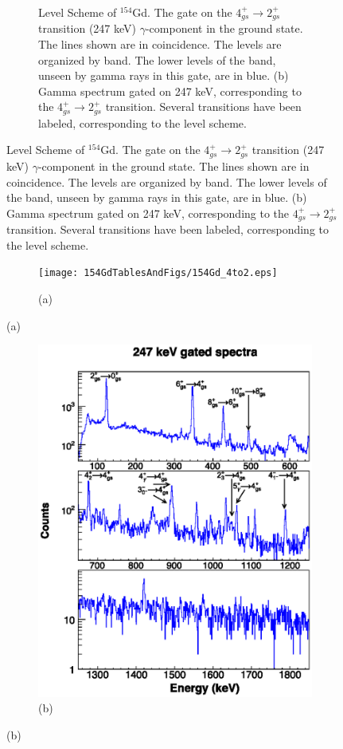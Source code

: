 \begin{landscape}
\begin{figure}[!]
    \centering
    \label{fig:154_4to2}
    \begin{subfigure}{1.4\textwidth}
    \caption{\centering \fontsize{10pt}{12pt}Level Scheme of $^{154}$Gd. The gate on the $4_{gs}^+\rightarrow 2_{gs}^+$ transition (247 keV) $\gamma$-component in the ground state. The lines shown are in coincidence. The levels are organized by band. The lower levels of the band, unseen by gamma rays in this gate, are in blue. (b) Gamma spectrum gated on 247 keV, corresponding to the $4_{gs}^+\rightarrow 2_{gs}^+$ transition. Several transitions have been labeled, corresponding to the level scheme.}
    \end{subfigure}
\end{figure}
\clearpage
\begin{figure}
    \ContinuedFloat
    \begin{subfigure}{1.4\textwidth}
    \texttt{[image: 154GdTablesAndFigs/154Gd\_4to2.eps]}
    \caption*{(a)}
    \label{fig:154_4to2level}
    \end{subfigure}
    \end{figure}
    \end{landscape}
    \begin{figure}
    \ContinuedFloat
    \begin{subfigure}{\textwidth}
    \includegraphics[scale=1.3]{154GdTablesAndFigs/247_gamma.eps}
    \caption*{(b)}
    \label{fig:154_4to2spec}
    \end{subfigure}
\end{figure}